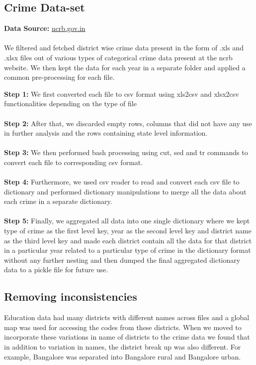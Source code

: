 \documentclass[twoside]{article}
\begin{document}
\subsection*{Crime Data-set}
\textbf{Data Source:} \href{https://ncrb.gov.in/en/crime-in-india-table-contents?field\_date\_value\%5Bvalue\%5D\%5Byear\%5D=\&field\_select\_additional\_table\_ti\_value=All\&items\_per\_page=All}{ncrb.gov.in}\\
\\
We filtered and fetched district wise crime data present in the form of .xls and .xlsx files out of various types of categorical crime data present at the ncrb website. We then kept the data for each year in a separate folder and applied a common pre-processing for each file.

\textbf{Step 1:} We first converted each file to csv format using xls2csv and xlsx2csv functionalities depending on the type of file\\\\
\textbf{Step 2:} After that, we discarded empty rows, columns that did not have any use in further analysis and the rows containing state level information.\\\\
\textbf{Step 3:} We then performed bash processing using cut, sed and tr commands to convert each file to corresponding csv format.\\\\
\textbf{Step 4:} Furthermore, we used csv reader to read and convert each csv file to dictionary and performed dictionary manipulations to merge all the data about each crime in a separate dictionary.\\\\
\textbf{Step 5:} Finally, we aggregated all data into one single dictionary where we kept type of crime as the first level key, year as the second level key and district name as the third level key and made each district contain all the data for that district in a particular year related to a particular type of crime in the dictionary format without any further nesting and then dumped the final aggregated dictionary data to a pickle file for future use.

\subsection*{Removing inconsistencies}
Education data had many districts with different names across files and a global map was used for accessing the codes from these districts. When we moved to incorporate these variations in name of districts to the crime data we found that in addition to variation in names, the district break up was also different. For example, Bangalore was separated into Bangalore rural and Bangalore urban. 
\end{document}
